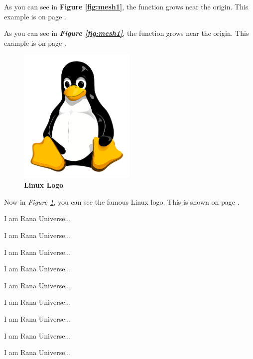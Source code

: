 \documentclass[12pt, letterpaper]{article}
\begin{document}
As you can see in \textbf{Figure \ref{fig:mesh1}}, the function grows near the origin. This example is on page \pageref{fig:mesh1}.


As you can see in \textbf{\textit{Figure \ref{fig:mesh1}}}, the function grows near the origin. This example is on page \pageref{fig:mesh1}.



\begin{figure}[htbp]
	\centering
	\includegraphics[width=0.5\textwidth]{linux_logo.png}
	\caption{\textbf{Linux Logo}}
	\label{fig:linuxlogo}
\end{figure}

Now in \textit{Figure \ref{fig:linuxlogo}}, you can see the famous Linux logo.
This is shown on page \pageref{fig:linuxlogo}.





\vspace{10em}

I am Rana Universe...

I am Rana Universe...

I am Rana Universe...

I am Rana Universe...

I am Rana Universe...

I am Rana Universe...

I am Rana Universe...

I am Rana Universe...

I am Rana Universe...

\vspace{3em}





\lipsum[1]

\lipsum[2]

\vspace{1em}

\lipsum[1]




\end{document}
